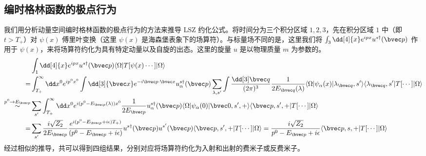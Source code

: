 
\subsection{编时格林函数的极点行为}
我们用分析动量空间编时格林函数的极点行为的方法来推导 LSZ 约化公式。将时间分为三个积分区域 $1,2,3$，先在积分区域 $1$ 中（即 $t>T_+$）对 $\psi(x)$ 傅里叶变换（这里 $\psi(x)$ 是海森堡表象下的场算符）。与标量场不同的是，这里我们将 $\int_{3} \dd[4]{x} e^{ipx} u^{s\dagger}(\bvec p)$ 作用于 $\psi(x)$，来将场算符约化为具有特定动量以及自旋的出态。这里的旋量 $u$ 是以物理质量 $m$ 为参数的。
\begin{equation}
\begin{aligned}
&\int_{1} \dd[4]{x} e^{ipx} u^{s\dagger}(\bvec p)\langle \Omega|T[\psi(x)\cdots]|\Omega\rangle\\
=&\int_{T_+}^\infty \dd x^0 e^{ip^0x^0}\int \dd[3]{\bvec x} e^{-i\bvec p\cdot \bvec x} u^{s\dagger}_\alpha(\bvec p)
\sum_{\lambda, s'}\int \frac{\dd[3] \bvec q}{(2\pi)^3} \frac{1}{2E_{\bvec q}(\lambda)}\langle \Omega|\psi_\alpha(x)|\lambda_{\bvec q},s'\rangle \langle \lambda_{\bvec q},s'| T[\cdots]|\Omega\rangle\\
\stackrel{p^0\rightarrow E_{\bvec p}}{\sim}
&
\sum_{s'}\int_{T_+}^\infty \dd x^0 e^{i(p^0-E_{\bvec p}(\lambda))x^0}
\frac{1}{2E_{\bvec p}} u^{s\dagger}_\alpha(\bvec p)\langle \Omega|\psi_\alpha(0)|\bvec 0,s',+\rangle\langle \bvec p,s',+| T[\cdots]|\Omega\rangle\\
=&\sum_{s'}\frac{i\sqrt{Z_2}}{2E_{\bvec p}}\frac{e^{i(p^0-E_{\bvec p}+i\epsilon)T_+)}}{(p^0-E_{\bvec p}+i\epsilon)} u^{s\dagger}(\bvec p)u^{s'}(\bvec p)\langle \bvec p,s',+| T[\cdots]|\Omega\rangle= \frac{i\sqrt{Z_2}}{p^0-E_{\bvec p}+i\epsilon} \langle \bvec p,s,+| T[\cdots]|\Omega\rangle
\end{aligned}
\end{equation}
经过相似的推导，共可以得到四组结果，分别对应将场算符约化为入射和出射的费米子或反费米子。
